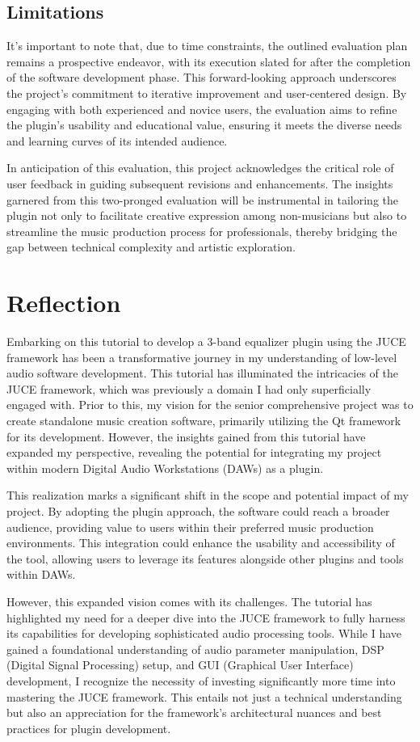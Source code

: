 \documentclass[10pt,twocolumn]{article}
\begin{document}
\subsection{Limitations}
It's important to note that, due to time constraints, the outlined evaluation plan remains a prospective endeavor, with its execution slated for after the completion of the software development phase. This forward-looking approach underscores the project's commitment to iterative improvement and user-centered design. By engaging with both experienced and novice users, the evaluation aims to refine the plugin's usability and educational value, ensuring it meets the diverse needs and learning curves of its intended audience.

In anticipation of this evaluation, this project acknowledges the critical role of user feedback in guiding subsequent revisions and enhancements. The insights garnered from this two-pronged evaluation will be instrumental in tailoring the plugin not only to facilitate creative expression among non-musicians but also to streamline the music production process for professionals, thereby bridging the gap between technical complexity and artistic exploration.



\section{Reflection}
Embarking on this tutorial to develop a 3-band equalizer plugin using the JUCE framework has been a transformative journey in my understanding of low-level audio software development. This tutorial has illuminated the intricacies of the JUCE framework, which was previously a domain I had only superficially engaged with. Prior to this, my vision for the senior comprehensive project was to create standalone music creation software, primarily utilizing the Qt framework for its development. However, the insights gained from this tutorial have expanded my perspective, revealing the potential for integrating my project within modern Digital Audio Workstations (DAWs) as a plugin.

This realization marks a significant shift in the scope and potential impact of my project. By adopting the plugin approach, the software could reach a broader audience, providing value to users within their preferred music production environments. This integration could enhance the usability and accessibility of the tool, allowing users to leverage its features alongside other plugins and tools within DAWs.

However, this expanded vision comes with its challenges. The tutorial has highlighted my need for a deeper dive into the JUCE framework to fully harness its capabilities for developing sophisticated audio processing tools. While I have gained a foundational understanding of audio parameter manipulation, DSP (Digital Signal Processing) setup, and GUI (Graphical User Interface) development, I recognize the necessity of investing significantly more time into mastering the JUCE framework. This entails not just a technical understanding but also an appreciation for the framework's architectural nuances and best practices for plugin development.

\printbibliography
\end{document}
